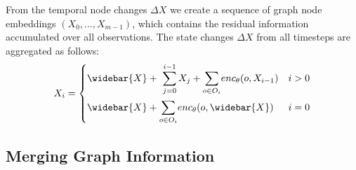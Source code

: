 
From the temporal node changes $\Delta X$ we create a sequence of graph node embeddings $(X_0, \dots, X_{m-1})$, which contains the residual information accumulated over all observations.
The state changes $\Delta X$ from all timesteps are aggregated as follows:
\begin{align}
X_i = 
\begin{cases}
    \widebar{X} + \,\, \mathlarger{\sum}\limits_{j=0}^{i-1} \, X_j + \mathlarger{\sum}\limits_{o \in O_i} enc_{\theta}(o, X_{i-1}) & i > 0\\[15pt]
    \widebar{X} + \mathlarger{\sum}\limits_{o \in O_i} enc_{\theta}(o, \widebar{X}) & i = 0
\end{cases}
\label{eq:Vi}
\end{align}



\subsection{Merging Graph Information}
\label{subsec:merge}


